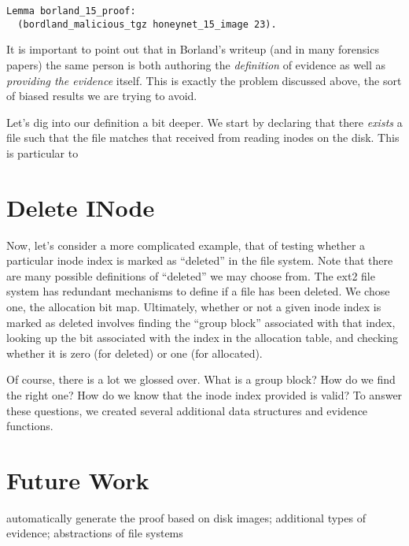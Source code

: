 \documentclass[nocopyrightspace]{sigplanconf}
\begin{document}
\begin{lstlisting}
Lemma borland_15_proof: 
  (bordland_malicious_tgz honeynet_15_image 23).
\end{lstlisting}

It is important to point out that in Borland's writeup (and in many forensics
papers) the same person is both authoring the {\it definition} of evidence as
well as {\it providing the evidence} itself. This is exactly the problem
discussed above, the sort of biased results we are trying to avoid.

Let's dig into our definition a bit deeper. We start by declaring that there
{\it exists} a file such that the file matches that received from reading
inodes on the disk. This is particular to 


\section{Delete INode}

Now, let's consider a more complicated example, that of testing whether a
particular inode index is marked as ``deleted'' in the file system. Note that
there are many possible definitions of ``deleted'' we may choose from. The
ext2 file system has redundant mechanisms to define if a file has been
deleted. We chose one, the allocation bit map. Ultimately, whether or not a
given inode index is marked as deleted involves finding the ``group block''
associated with that index, looking up the bit associated with the index in
the allocation table, and checking whether it is zero (for deleted) or one
(for allocated).

Of course, there is a lot we glossed over. What is a group block? How do we
find the right one? How do we know that the inode index provided is valid? To
answer these questions, we created several additional data structures and
evidence functions.

\section{Future Work}

automatically generate the proof based on disk images; additional types of
evidence; abstractions of file systems
\end{document}
